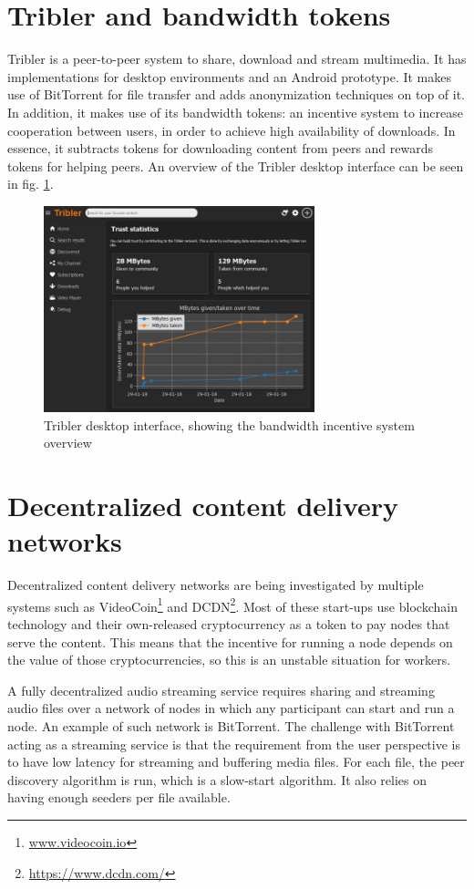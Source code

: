 \section{Tribler and bandwidth tokens}
Tribler is a peer-to-peer system to share, download and stream multimedia. It has implementations for desktop environments and an Android prototype. It makes use of BitTorrent for file transfer and adds anonymization techniques on top of it. In addition, it makes use of its bandwidth tokens: an incentive system to increase cooperation between users, in order to achieve high availability of downloads. In essence, it subtracts tokens for downloading content from peers and rewards tokens for helping peers. An overview of the Tribler desktop interface can be seen in fig. \ref{fig:tribler}.

\begin{figure}
    \includegraphics[width=0.7\textwidth]{related-work/tribler7.3.0.png}
    \caption{Tribler desktop interface, showing the bandwidth incentive system overview}
    \label{fig:tribler}
\end{figure}

\section{Decentralized content delivery networks}
Decentralized content delivery networks are being investigated by multiple systems such as VideoCoin\footnote{\url{www.videocoin.io}} and DCDN\footnote{\url{https://www.dcdn.com/}}. Most of these start-ups use blockchain technology and their own-released cryptocurrency as a token to pay nodes that serve the content. This means that the incentive for running a node depends on the value of those cryptocurrencies, so this is an unstable situation for workers. 

A fully decentralized audio streaming service requires sharing and streaming audio files over a network of nodes in which any participant can start and run a node. An example of such network is BitTorrent. The challenge with BitTorrent acting as a streaming service is that the requirement from the user perspective is to have low latency for streaming and buffering media files. For each file, the peer discovery algorithm is run, which is a slow-start algorithm. It also relies on having enough seeders per file available.

